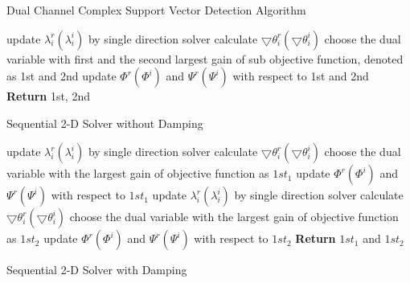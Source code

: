 \documentclass[12pt, draftclsnofoot, onecolumn]{IEEEtran}
\begin{document}
\begin{spacing}{2}
\begin{algorithm}
\begin{algorithmic}
\EndProcedure
\end{algorithmic}
\label{CSVD algorithm}
\caption{Dual Channel Complex Support Vector Detection Algorithm }
\end{algorithm}

\begin{algorithm}
\begin{algorithmic}
\State update $\lambda^{r}_{i}(\lambda_{i}^{i})$ by single direction solver
\State calculate $\bigtriangledown \theta^{r}_{i}(\bigtriangledown \theta_{i}^{i})$
\EndFor
\State choose the dual variable with first and the second largest gain of sub objective function, denoted as 1st and 2nd
\State update $\Phi^{r}(\Phi^{i})$ and $\Psi^{r}(\Psi^{i})$ with respect to 1st and 2nd
\State \textbf{Return} 1st, 2nd
\EndProcedure
\end{algorithmic}
\caption{Sequential 2-D Solver without Damping}
\label{1D2D Nodamping}
\end{algorithm} 
 
 
 \begin{algorithm}
\begin{algorithmic}
\State update $\lambda_{i}^{r}(\lambda_{i}^{i})$ by single direction solver
\State calculate $\bigtriangledown \theta_{i}^{r}(\bigtriangledown \theta_{i}^{i})$ 
\EndFor
\State choose the dual variable with the largest gain of objective function as $1st_{1}$
\State update $\Phi^{r}(\Phi^{i})$ and $\Psi^{r}(\Psi^{i})$ with respect to $1st_{1}$
 
\State update $\lambda_{i}^{r}(\lambda_{i}^{i})$ by single direction solver
\State calculate $\bigtriangledown \theta_{i}^{r}(\bigtriangledown \theta_{i}^{i})$ 
\EndFor
\State choose the dual variable with the largest gain of objective function as $1st_{2}$
\State update $\Phi^{r}(\Phi^{i})$ and $\Psi^{r}(\Psi^{i})$ with respect to $1st_{2}$
\State \textbf{Return} $1st_{1}$ and $1st_{2}$
\EndProcedure
\end{algorithmic}
\caption{Sequential 2-D Solver with Damping}
\label{1D2D damping}
\end{algorithm} 


\end{spacing}
\end{document}
